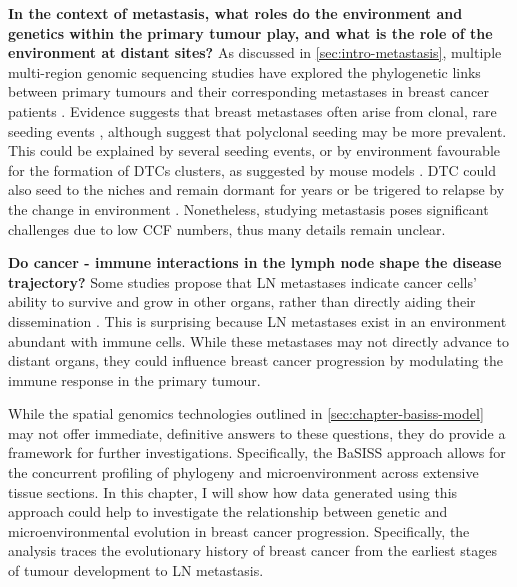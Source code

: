 \textbf{In the context of metastasis, what roles do the environment and genetics within the primary tumour play, and what is the role of the environment at distant sites?} As discussed in \cref{sec:intro-metastasis}, multiple multi-region genomic sequencing studies have explored the phylogenetic links between primary tumours and their corresponding metastases in breast cancer patients \parencite{De_Mattos-Arruda2019-sb,Yates2015-xk,Yates2017-xc,Brown2017-de}. Evidence suggests that breast metastases often arise from clonal, rare seeding events \parencite{Brown2017-de, De_Mattos-Arruda2019-sb}, although \textcite{De_Mattos-Arruda2019-sb} suggest that polyclonal seeding may be more prevalent. This could be explained by several seeding events, or by environment favourable for the formation of \acp{DTC} clusters, as suggested by mouse models \parencite{Cheung2016-nb}. \ac{DTC} could also seed to the niches and remain dormant for years or be trigered to relapse by the change in environment \parencite{Szczerba2019-mt,Diamantopoulou2022-sb}. Nonetheless, studying metastasis poses significant challenges due to low \ac{CCF} numbers, thus many details remain unclear. 

\textbf{Do cancer - immune interactions in the lymph node shape the disease trajectory?}
Some studies propose that \ac{LN} metastases indicate cancer cells' ability to survive and grow in other organs, rather than directly aiding their dissemination \parencite{Fisher1977-ua, Ullah2018-xe}. This is surprising because \ac{LN} metastases exist in an environment abundant with immune cells. While these metastases may not directly advance to distant organs, they could influence breast cancer progression by modulating the immune response in the primary tumour.

While the spatial genomics technologies outlined in \cref{sec:chapter-basiss-model} may not offer immediate, definitive answers to these questions, they do provide a framework for further investigations. Specifically, the \ac{BaSISS} approach allows for the concurrent profiling of phylogeny and microenvironment across extensive tissue sections. In this chapter, I will show how data generated using this approach could help to investigate the relationship between genetic and microenvironmental evolution in breast cancer progression. Specifically, the analysis traces the evolutionary history of breast cancer from the earliest stages of tumour development to \ac{LN} metastasis.

